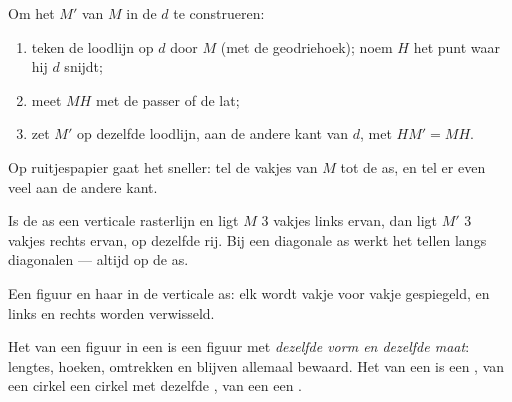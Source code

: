 \begin{method}\label{met:g6:symmetry:construct}
Om het  $M'$ van $M$ in de  $d$ te construeren:
\begin{enumerate}
  \item teken de loodlijn op $d$ door $M$ (met de geodriehoek); noem $H$ het
        punt waar hij $d$ snijdt;
  \item meet $MH$ met de passer of de lat;
  \item zet $M'$ op dezelfde loodlijn, aan de andere kant van $d$, met
        $HM' = MH$.
\end{enumerate}
Op ruitjespapier gaat het sneller: tel de vakjes van $M$ tot de as, en tel er
even veel aan de andere kant.
\end{method}

\begin{example}\label{ex:g6:symmetry:grid}
Is de as een verticale rasterlijn en ligt $M$ $3$ vakjes links ervan, dan ligt
$M'$ $3$ vakjes rechts ervan, op dezelfde rij. Bij een diagonale as werkt het
tellen langs diagonalen --- altijd  op de as.
\end{example}

\begin{omfigure}

{\small Een figuur en haar  in de verticale as: elk  wordt
vakje voor vakje gespiegeld, en links en rechts worden verwisseld.}
\end{omfigure}

\begin{proposition}\label{prop:g6:symmetry:preserved}
Het  van een figuur in een  is een figuur met \emph{dezelfde
vorm en dezelfde maat}: lengtes, hoeken, omtrekken en  blijven
allemaal bewaard. Het  van een  is een , van een
cirkel een cirkel met dezelfde , van een  een .
\end{proposition}
\admitted

